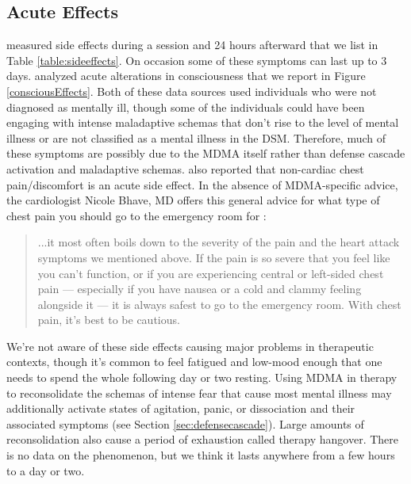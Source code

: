 \documentclass[12pt,letterpaper]{book}
\begin{document}
\subsection*{Acute Effects}
\label{acuteEffects}
\textcite{liechtiGender} measured side effects during a session and 24 hours afterward that we list in Table \ref{table:sideeffects}. On occasion some of these symptoms can last up to 3 days. \textcite{studerus2010psychometric} analyzed acute alterations in consciousness that we report in Figure \ref{consciousEffects}. Both of these data sources used individuals who were not diagnosed as mentally ill, though some of the individuals could have been engaging with intense maladaptive schemas that don't rise to the level of mental illness or are not classified as a mental illness in the DSM. Therefore, much of these symptoms are possibly due to the MDMA itself rather than defense cascade activation and maladaptive schemas. \textcite{colcott2024side} also reported that non-cardiac chest pain/discomfort is an acute side effect. In the absence of MDMA-specific advice, the cardiologist Nicole Bhave, MD offers this general advice for what type of chest pain you should go to the emergency room for \cite{chestPain}:
\begin{quotation}
    ...it most often boils down to the severity of the pain and the heart attack symptoms we mentioned above. If the pain is so severe that you feel like you can’t function, or if you are experiencing central or left-sided chest pain — especially if you have nausea or a cold and clammy feeling alongside it — it is always safest to go to the emergency room. With chest pain, it’s best to be cautious.
\end{quotation}
We're not aware of these side effects causing major problems in therapeutic contexts, though it's common to feel fatigued and low-mood enough that one needs to spend the whole following day or two resting. Using MDMA in therapy to reconsolidate the schemas of intense fear that cause most mental illness may additionally activate states of agitation, panic, or dissociation and their associated symptoms (see Section \ref{sec:defensecascade}). Large amounts of reconsolidation also cause a period of exhaustion called therapy hangover. There is no data on the phenomenon, but we think it lasts anywhere from a few hours to a day or two.
\FloatBarrier
\end{document}
